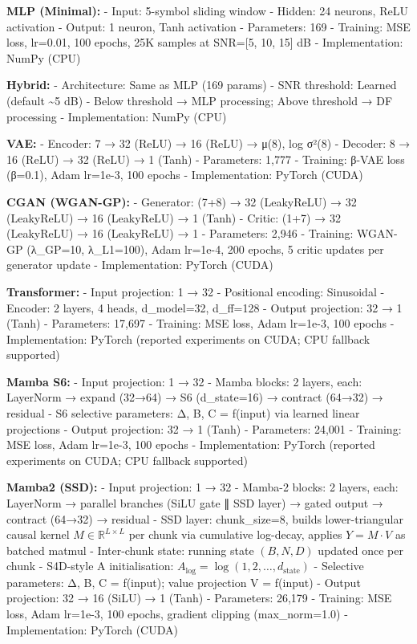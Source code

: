 \documentclass[
  english,
  12pt,
  12pt,
  a4paper,
  oneside]{report}
\begin{document}
\textbf{MLP (Minimal):} - Input: 5-symbol sliding window - Hidden: 24 neurons, ReLU activation - Output: 1 neuron, Tanh activation - Parameters: 169 - Training: MSE loss, lr=0.01, 100 epochs, 25K samples at SNR={[}5, 10, 15{]} dB - Implementation: NumPy (CPU)

\textbf{Hybrid:} - Architecture: Same as MLP (169 params) - SNR threshold: Learned (default \textasciitilde5 dB) - Below threshold → MLP processing; Above threshold → DF processing - Implementation: NumPy (CPU)

\textbf{VAE:} - Encoder: 7 → 32 (ReLU) → 16 (ReLU) → μ(8), log σ²(8) - Decoder: 8 → 16 (ReLU) → 32 (ReLU) → 1 (Tanh) - Parameters: 1,777 - Training: β-VAE loss (β=0.1), Adam lr=1e-3, 100 epochs - Implementation: PyTorch (CUDA)

\textbf{CGAN (WGAN-GP):} - Generator: (7+8) → 32 (LeakyReLU) → 32 (LeakyReLU) → 16 (LeakyReLU) → 1 (Tanh) - Critic: (1+7) → 32 (LeakyReLU) → 16 (LeakyReLU) → 1 - Parameters: 2,946 - Training: WGAN-GP (λ\_GP=10, λ\_L1=100), Adam lr=1e-4, 200 epochs, 5 critic updates per generator update - Implementation: PyTorch (CUDA)

\textbf{Transformer:} - Input projection: 1 → 32 - Positional encoding: Sinusoidal - Encoder: 2 layers, 4 heads, d\_model=32, d\_ff=128 - Output projection: 32 → 1 (Tanh) - Parameters: 17,697 - Training: MSE loss, Adam lr=1e-3, 100 epochs - Implementation: PyTorch (reported experiments on CUDA; CPU fallback supported)

\textbf{Mamba S6:} - Input projection: 1 → 32 - Mamba blocks: 2 layers, each: LayerNorm → expand (32→64) → S6 (d\_state=16) → contract (64→32) → residual - S6 selective parameters: Δ, B, C = f(input) via learned linear projections - Output projection: 32 → 1 (Tanh) - Parameters: 24,001 - Training: MSE loss, Adam lr=1e-3, 100 epochs - Implementation: PyTorch (reported experiments on CUDA; CPU fallback supported)

\textbf{Mamba2 (SSD):} - Input projection: 1 → 32 - Mamba-2 blocks: 2 layers, each: LayerNorm → parallel branches (SiLU gate ∥ SSD layer) → gated output → contract (64→32) → residual - SSD layer: chunk\_size=8, builds lower-triangular causal kernel \(M \in \mathbb{R}^{L \times L}\) per chunk via cumulative log-decay, applies \(Y = M \cdot V\) as batched matmul - Inter-chunk state: running state \((B, N, D)\) updated once per chunk - S4D-style A initialisation: \(A_{\log} = \log(1, 2, \dots, d_{\text{state}})\) - Selective parameters: Δ, B, C = f(input); value projection V = f(input) - Output projection: 32 → 16 (SiLU) → 1 (Tanh) - Parameters: 26,179 - Training: MSE loss, Adam lr=1e-3, 100 epochs, gradient clipping (max\_norm=1.0) - Implementation: PyTorch (CUDA)
\end{document}
